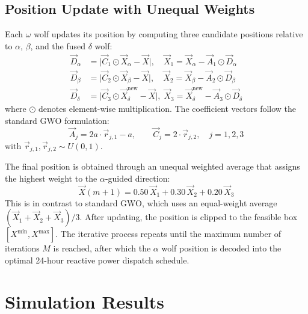 \subsection{Position Update with Unequal Weights}

Each $\omega$ wolf updates its position by computing three candidate positions relative to $\alpha$, $\beta$, and the fused $\delta$ wolf:
\begin{equation}
\begin{aligned}
\vec{D}_\alpha &= \bigl|\vec{C}_1 \odot \vec{X}_\alpha - \vec{X}\bigr|, \quad
\vec{X}_1 = \vec{X}_\alpha - \vec{A}_1 \odot \vec{D}_\alpha \\
\vec{D}_\beta  &= \bigl|\vec{C}_2 \odot \vec{X}_\beta  - \vec{X}\bigr|, \quad
\vec{X}_2 = \vec{X}_\beta  - \vec{A}_2 \odot \vec{D}_\beta \\
\vec{D}_\delta &= \bigl|\vec{C}_3 \odot \vec{X}_\delta^{\text{new}} - \vec{X}\bigr|, \;
\vec{X}_3 = \vec{X}_\delta^{\text{new}} - \vec{A}_3 \odot \vec{D}_\delta
\end{aligned}
\label{eq:candidate_positions}
\end{equation}
where $\odot$ denotes element-wise multiplication. The coefficient vectors follow the standard GWO formulation:
\begin{equation}
\vec{A}_j = 2a \cdot \vec{r}_{j,1} - a,\qquad
\vec{C}_j = 2 \cdot \vec{r}_{j,2},\quad j=1,2,3
\label{eq:coefficient_vectors}
\end{equation}
with $\vec{r}_{j,1}, \vec{r}_{j,2} \sim U(0,1)$.

The final position is obtained through an unequal weighted average that assigns the highest weight to the $\alpha$-guided direction:
\begin{equation}
\vec{X}(m+1) = 0.50\,\vec{X}_1 + 0.30\,\vec{X}_2 + 0.20\,\vec{X}_3
\label{eq:position_update}
\end{equation}
This is in contrast to standard GWO, which uses an equal-weight average $(\vec{X}_1+\vec{X}_2+\vec{X}_3)/3$. After updating, the position is clipped to the feasible box $[X^{\min}, X^{\max}]$. The iterative process repeats until the maximum number of iterations $M$ is reached, after which the $\alpha$ wolf position is decoded into the optimal 24-hour reactive power dispatch schedule.

\section{Simulation Results}

